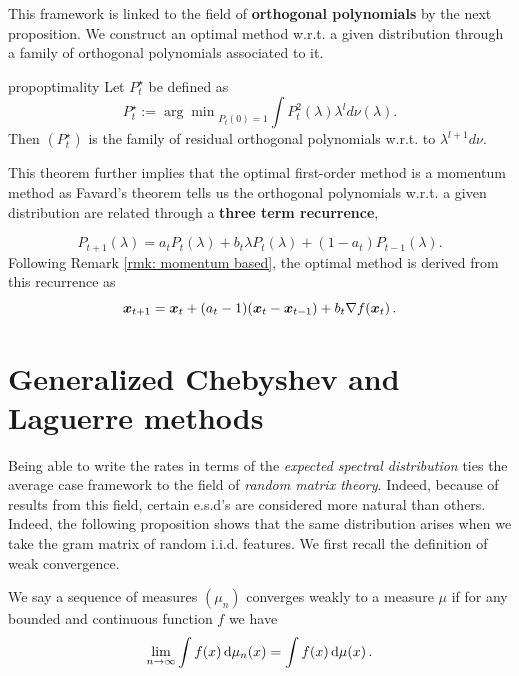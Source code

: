 \documentclass{article}
\begin{document}
This framework is  linked to the field of \textbf{orthogonal polynomials} by the next proposition. We construct an optimal method w.r.t. a given distribution through a family  of orthogonal polynomials associated to it.


\begin{restatable}{prop}{optimality}\citep{pedregosa2020acceleration}
 \label{prop: optimality}
 Let $P_t^\star$ be defined as
 \begin{equation}
     P_t^\star:={\arg \min}_{P_t(0)=1} \int P_t^2(\lambda) \lambda^l d\nu(\lambda).
 \end{equation}
 Then $(P_t^\star)$ is the family of residual orthogonal polynomials w.r.t. to $\lambda^{l+1}d\nu$.
\end{restatable}

This theorem further implies that the optimal first-order method is a momentum method as Favard's theorem \cite{marcellan2001favard} tells us the orthogonal polynomials w.r.t. a given distribution are related through a \textbf{three term recurrence},

\begin{equation}
    P_{t+1}(\lambda)=a_tP_t(\lambda)+b_t\lambda P_t(\lambda)+(1-a_t)P_{t-1}(\lambda).
\end{equation}
Following Remark \ref{rmk: momentum based}, the optimal method is derived from this recurrence as
\begin{equation}
    {\boldsymbol x}_{t+1}={\boldsymbol x}_t+(a_t-1)({\boldsymbol x}_t-{\boldsymbol x}_{t-1})+b_t\nabla f({\boldsymbol x}_t)\,.
\end{equation}



\section{Generalized Chebyshev and Laguerre methods} \label{section: methods}
Being able to write the rates in terms of the \textit{expected spectral distribution} ties the average case framework to the field of \textit{random matrix theory}. Indeed, because of results from this field, certain e.s.d's are considered more natural than others. Indeed, the following proposition shows that the same distribution arises when we take the gram matrix of random i.i.d. features. We first recall the definition of weak convergence.%

\begin{definition}
We say a sequence of measures $(\mu_n)$ converges weakly to a measure $\mu$ if for any bounded and continuous function $f$ we have
\begin{equation}
    \lim_{n\rightarrow\infty}\int f(x)\mathop{}\!\mathrm{d} \mu_n(x)=\int f(x) \mathop{}\!\mathrm{d}\mu(x)\,.
\end{equation}

\end{definition}
\end{document}
